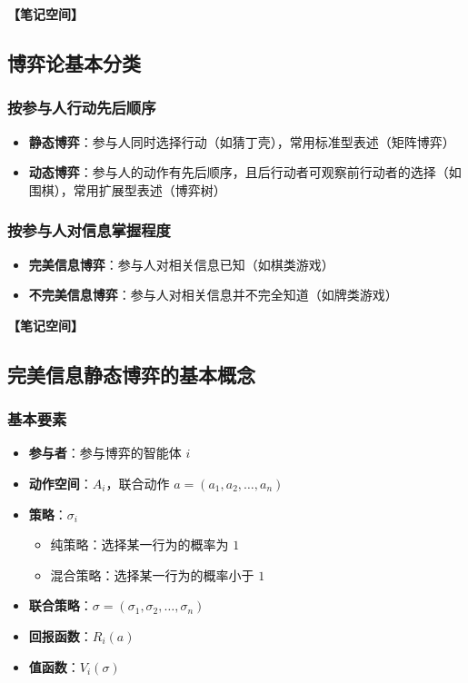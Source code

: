 \documentclass[12pt,a4paper]{article}
\newcommand{\notespace}[1][3cm]{%
  \vspace{#1}%
  \noindent\textbf{【笔记空间】}%
  \vspace{#1}%
}
\newcommand{\1}{\mathbf{1}}
\begin{document}
\notespace[2cm]

\subsection{博弈论基本分类}

\subsubsection*{按参与人行动先后顺序}

\begin{itemize}[leftmargin=2em]
  \item \textbf{静态博弈}：参与人同时选择行动（如猜丁壳），常用标准型表述（矩阵博弈）
  \item \textbf{动态博弈}：参与人的动作有先后顺序，且后行动者可观察前行动者的选择（如围棋），常用扩展型表述（博弈树）
\end{itemize}

\subsubsection*{按参与人对信息掌握程度}

\begin{itemize}[leftmargin=2em]
  \item \textbf{完美信息博弈}：参与人对相关信息已知（如棋类游戏）
  \item \textbf{不完美信息博弈}：参与人对相关信息并不完全知道（如牌类游戏）
\end{itemize}

\notespace[2cm]

\subsection{完美信息静态博弈的基本概念}

\subsubsection*{基本要素}

\begin{itemize}[leftmargin=2em]
  \item \textbf{参与者}：参与博弈的智能体 $i$
  \item \textbf{动作空间}：$A_i$，联合动作 $a=(a_1,a_2,\dots,a_n)$
  \item \textbf{策略}：$\sigma_i$
  \begin{itemize}
    \item 纯策略：选择某一行为的概率为 $1$
    \item 混合策略：选择某一行为的概率小于 $1$
  \end{itemize}
  \item \textbf{联合策略}：$\sigma=(\sigma_1,\sigma_2,\dots,\sigma_n)$
  \item \textbf{回报函数}：$R_i(a)$
  \item \textbf{值函数}：$V_i(\sigma)$
\end{itemize}
\end{document}
